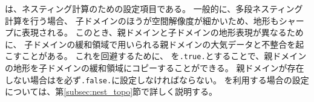 は、ネスティング計算のための設定項目である。
一般的に、多段ネスティング計算を行う場合、
子ドメインのほうが空間解像度が細かいため、地形もシャープに表現される。
このとき、親ドメインと子ドメインの地形表現が異なるために、
子ドメインの緩和領域で用いられる親ドメインの大気データと不整合を起こすことがある。
これを回避するために、
を\verb|.true.|とすることで、親ドメインの地形を子ドメインの緩和領域にコピーすることができる。
親ドメインが存在しない場合はを必ず\verb|.false.|に設定しなければならない。
を利用する場合の設定については、第\ref{subsec:nest_topo}節で詳しく説明する。
